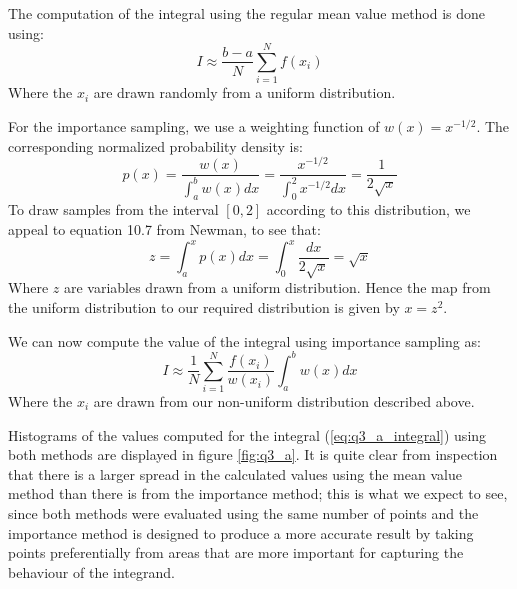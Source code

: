 \documentclass{article}
\begin{document}
The computation of the integral using the regular mean value method is done using:
\begin{equation}
	\label{eq:q3_mv}
	I \approx \frac{b-a}{N}\sum_{i=1}^N f(x_i)
\end{equation}
Where the $x_i$ are drawn randomly from a uniform distribution.

For the importance sampling, we use a weighting function of $w(x) = x^{-1/2}$. The corresponding normalized probability density is:
\begin{equation}
	p(x) = \frac{w(x)}{\int_a^b w(x)dx} = \frac{x^{-1/2}}{\int_0^2 x^{-1/2}dx} = \frac{1}{2\sqrt{x}}
\end{equation}
To draw samples from the interval $[0,2]$ according to this distribution, we appeal to equation 10.7 from Newman, to see that:
\begin{equation}
	z = \int_a^x p(x)dx = \int_0^x \frac{dx}{2\sqrt{x}} = \sqrt{x} 
\end{equation}
Where $z$ are variables drawn from a uniform distribution. Hence the map from the uniform distribution to our required distribution is given by $x = z^2$.

We can now compute the value of the integral using importance sampling as:
\begin{equation}
	\label{eq:q3_is}
	I \approx \frac{1}{N}\sum_{i=1}^N \frac{f(x_i)}{w(x_i)} \int_a^b w(x)dx
\end{equation}
Where the $x_i$ are drawn from our non-uniform distribution described above.

Histograms of the values computed for the integral (\ref{eq:q3_a_integral}) using both methods are displayed in figure \ref{fig:q3_a}. It is quite clear from inspection that there is a larger spread in the calculated values using the mean value method than there is from the importance method; this is what we expect to see, since both methods were evaluated using the same number of points and the importance method is designed to produce a more accurate result by taking points preferentially from areas that are more important for capturing the behaviour of the integrand.
\end{document}
